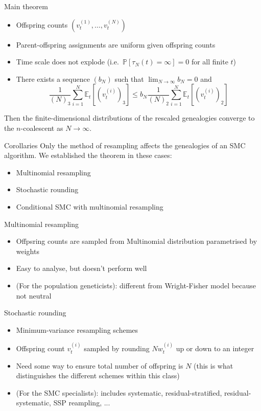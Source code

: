 \documentclass[aspectratio=169]{beamer}
\theoremstyle{definition}
\newcommand{\PR}{\mathbb{P}}
\newcommand{\E}{\mathbb{E}}
\newcommand{\vt}[2][t]{v_{#1}^{(#2)}}
\newcommand{\wt}[2][t]{w_{#1}^{(#2)}}
\begin{document}
\begin{frame}{Main theorem}
\begin{itemize}
\item Offspring counts $(\vt{1},\dots,\vt{N})$
\item Parent-offspring assignments are uniform given offspring counts
\item Time scale does not explode (i.e.\ $\PR[\tau_N(t)=\infty]=0$ for all finite $t$)
\item There exists a sequence $(b_N)$ such that $\lim_{N\to\infty} b_N = 0$ and
\begin{equation*}
\frac{1}{(N)_3} \sum_{i=1}^N \E_t [ (\vt{i})_3 ]
\leq b_N \frac{1}{(N)_2} \sum_{i=1}^N \E_t [ (\vt{i})_2 ]
\end{equation*}
\end{itemize}
Then the finite-dimensional distributions of the rescaled genealogies converge to the $n$-coalescent as $N\to\infty$.
\end{frame}


\begin{frame}{Corollaries}
Only the method of resampling affects the genealogies of an SMC algorithm. We established the theorem in these cases:
\begin{itemize}
\item Multinomial resampling
\item Stochastic rounding 
\item Conditional SMC with multinomial resampling
\end{itemize}
\end{frame}


\begin{frame}{Multinomial resampling}
\begin{itemize}
\item Offpsring counts are sampled from Multinomial distribution parametrised by weights
\item Easy to analyse, but doesn't perform well
\item (For the population geneticists): different from Wright-Fisher model because not neutral
\end{itemize}
\end{frame}


\begin{frame}{Stochastic rounding}
\begin{itemize}
\item Minimum-variance resampling schemes
\item Offspring count $\vt{i}$ sampled by rounding $N \wt{i}$ up or down to an integer
\item Need some way to ensure total number of offspring is $N$ (this is what distinguishes the different schemes within this class)
\item (For the SMC specialists): includes systematic, residual-stratified, residual-systematic, SSP reampling, ...
\end{itemize}
\end{frame}
\end{document}
